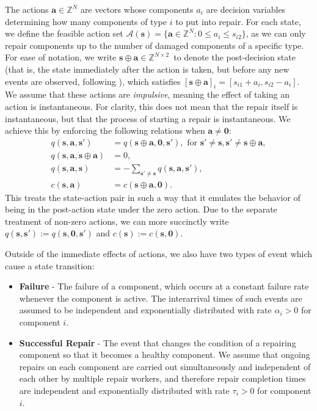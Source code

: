 \documentclass[11pt,authoryear,a4paper]{article}
\newcommand{\ZZ}{\mathbb{Z}}
\theoremstyle{definition}
\begin{document}
The actions $\mathbf{a}\in\ZZ^N$ are vectors whose components $a_{i}$ are decision variables determining how many components of type $i$ to put into repair. For each state, we define the feasible action set $\mathcal{A}(\bm{s}) = \{\bm{a}\in\ZZ^N:0\leq a_i \leq s_{i2}\}$, as we can only repair components up to the number of damaged components of a specific type. For ease of notation, we write $\bm{s}\oplus\bm{a}\in\ZZ^{N\times2}$\ to denote the post-decision state (that is, the state immediately after the action is taken, but before any new events are observed, following \cite{powell2011adp}), which satisfies $[\bm{s}\oplus\bm{a}]_i = [s_{i1} + a_i, s_{i2} - a_i]$. We assume that these actions are \emph{impulsive}, meaning the effect of taking an action is instantaneous. For clarity, this does not mean that the repair itself is instantaneous, but that the process of starting a repair is instantaneous. We achieve this by enforcing the following relations when $\bm{a}\neq\bm{0}$:
\begin{align*}
    q(\bm{s},\bm{a}, \bm{s'}) &= q(\bm{s\oplus a, 0, s'}), \text{ for } \bm{s' \neq s, s' \neq s\oplus a},\\
    q(\bm{s,a,s\oplus a}) &= 0,\\
    q(\bm{s,a,s}) &= -\sum_{\bm{s'\neq s}} q(\bm{s,a,s'}),\\
    c(\bm{s}, \bm{a}) &= c(\bm{s\oplus a, 0}).
\end{align*}
This treats the state-action pair in such a way that it emulates the behavior of being in the post-action state under the zero action. Due to the separate treatment of non-zero actions, we can more succinctly write $q(\bm{s},\bm{s'}) := q(\bm{s},\bm{0},\bm{s'})$ and $c(\bm{s}) := c(\bm{s}, \bm{0})$.

Outside of the immediate effects of actions, we also have two types of event which cause a state transition:
\begin{itemize}
    \item \textbf{Failure} - The failure of a component, which occurs at a constant failure rate whenever the component is active. The interarrival times of such events are assumed to be independent and exponentially distributed with rate $\alpha_{i} > 0$ for component $i$. 
    \item \textbf{Successful Repair} - The event that changes the condition of a repairing component so that it becomes a healthy component. We assume that ongoing repairs on each component are carried out simultaneously and independent of each other by multiple repair workers, and therefore repair completion times are independent and exponentially distributed with rate $\tau_i > 0$ for component $i$.
\end{itemize}
\end{document}
